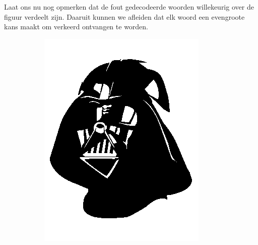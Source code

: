 \documentclass[]{article}
\begin{document}
\begin{section}
\begin{subsection}
        Laat ons nu nog opmerken dat de fout gedecodeerde woorden
        willekeurig over de figuur verdeelt zijn. Daaruit kunnen we
        afleiden dat elk woord een evengroote kans maakt om verkeerd
        ontvangen te worden.

        \begin{figure}
            \centering

            \begin{subfigure}{0.4\textwidth}
                \centering
                \includegraphics[width=\textwidth]{darthvader.png}
                \caption{}
                \label{fig:darthvader}
            \end{subfigure}
            \begin{subfigure}{0.4\textwidth}
                \centering

\end{subfigure}
\end{figure}
\end{subsection}
\end{section}
\end{document}
